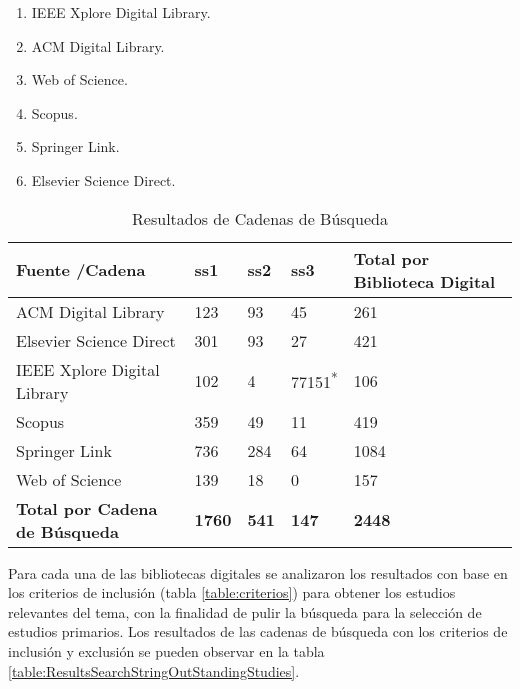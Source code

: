 \documentclass[fleqn,10pt]{SelfArx} %
\begin{document}
    \begin{enumerate}
        \label{orderLibraries}
            \item IEEE Xplore Digital Library.
            \item ACM Digital Library.
            \item Web of Science.
            \item Scopus.
            \item Springer Link.
            \item Elsevier Science Direct.
    \end{enumerate}    

    \begin{table}
    \begin{center}
        \caption{Resultados de Cadenas de Búsqueda}
        \label{table:ResultsSearchString}
        \begin{tabular}{| p{2.5cm} | p{.6cm} | p{.6cm} | p{.8cm} | p{1.5cm} |}
            \toprule
            \hline
            \textbf{Fuente /Cadena} & \textbf{ss1} & \textbf{ss2} & \textbf{ss3} & \textbf{Total por Biblioteca Digital}\\ \hline
            ACM Digital Library & 123 & 93 & 45 & 261\\ \hline
            Elsevier Science Direct & 301 & 93 & 27 & 421\\ \hline
            IEEE Xplore Digital Library & 102 & 4 & 77151\textsuperscript{*} & 106\\ \hline
            Scopus & 359 & 49 & 11 & 419\\ \hline
            Springer Link & 736 & 284 & 64 &  1084\\ \hline
            Web of Science & 139 & 18 & 0 & 157\\ \hline
            \textbf{Total por Cadena de Búsqueda} & \textbf{1760} & \textbf{541} & \textbf{147} & \textbf{2448}\\ \hline
        \end{tabular}
    \end{center}
    \end{table}
    Para cada una de las bibliotecas digitales se analizaron los resultados con base en los criterios de inclusión (tabla \ref{table:criterios}) para obtener los estudios relevantes del tema, con la finalidad de pulir la búsqueda para la selección de estudios primarios. Los resultados de las cadenas de búsqueda con los criterios de inclusión y exclusión se pueden observar en la tabla \ref{table:ResultsSearchStringOutStandingStudies}.
\end{document}
